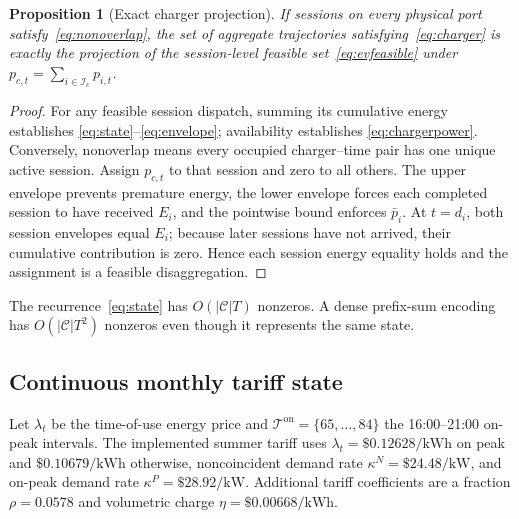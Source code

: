 \documentclass[11pt]{article}
\newtheorem{proposition}{Proposition}
\newcommand{\T}{\mathcal{T}}
\newcommand{\I}{\mathcal{I}}
\newcommand{\C}{\mathcal{C}}
\begin{document}
\begin{proposition}[Exact charger projection]
If sessions on every physical port satisfy~\eqref{eq:nonoverlap}, the set of
aggregate trajectories satisfying~\eqref{eq:charger} is exactly the projection
of the session-level feasible set~\eqref{eq:evfeasible} under
\(p_{c,t}=\sum_{i\in\I_c}p_{i,t}\).
\end{proposition}

\begin{proof}
For any feasible session dispatch, summing its cumulative energy establishes
\eqref{eq:state}--\eqref{eq:envelope}; availability establishes
\eqref{eq:chargerpower}.  Conversely, nonoverlap means every occupied
charger--time pair has one unique active session.  Assign \(p_{c,t}\) to that
session and zero to all others.  The upper envelope prevents premature energy,
the lower envelope forces each completed session to have received \(E_i\), and
the pointwise bound enforces \(\bar p_i\).  At \(t=d_i\), both session envelopes
equal \(E_i\); because later sessions have not arrived, their cumulative
contribution is zero.  Hence each session energy equality holds and the
assignment is a feasible disaggregation.
\end{proof}

The recurrence~\eqref{eq:state} has \(O(|\C|T)\) nonzeros.  A dense prefix-sum
encoding has \(O(|\C|T^2)\) nonzeros even though it represents the same state.

\subsection{Continuous monthly tariff state}

Let \(\lambda_t\) be the time-of-use energy price and
\(\T^{\mathrm{on}}=\{65,\ldots,84\}\) the 16:00--21:00 on-peak intervals.
The implemented summer tariff uses \(\lambda_t=\$0.12628/\mathrm{kWh}\) on peak
and \(\$0.10679/\mathrm{kWh}\) otherwise, noncoincident demand rate
\(\kappa^N=\$24.48/\mathrm{kW}\), and on-peak demand rate
\(\kappa^P=\$28.92/\mathrm{kW}\).  Additional tariff coefficients are a
fraction \(\rho=0.0578\) and volumetric charge
\(\eta=\$0.00668/\mathrm{kWh}\).
\end{document}
